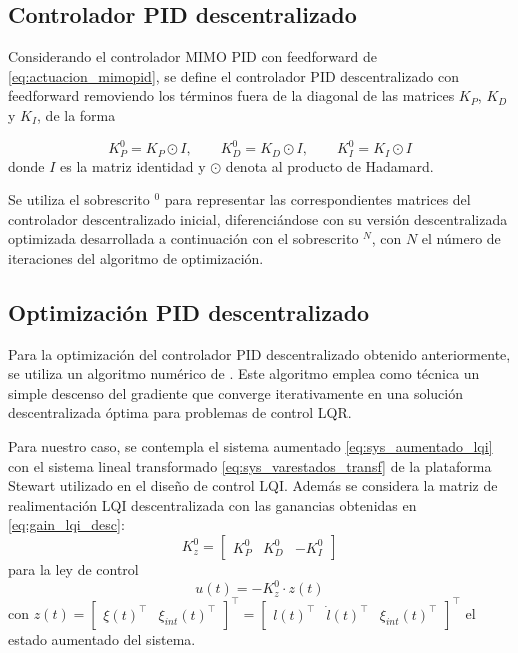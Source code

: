 \subsection{Controlador PID descentralizado}

Considerando el controlador MIMO PID con feedforward de \ref{eq:actuacion_mimopid}, se define el controlador PID descentralizado con feedforward removiendo los términos fuera de la diagonal de las matrices $K_P$, $K_D$ y $K_I$, de la forma

\begin{equation} \label{eq:gain_lqi_desc}
    K_P^0 = K_P \odot I, \qquad K_D^0 = K_D \odot I, \qquad K_I^0 = K_I \odot I 
\end{equation}
donde $I$ es la matriz identidad y $\odot$ denota al producto de Hadamard.

\begin{remark}
    Se utiliza el sobrescrito $^0$ para representar las correspondientes matrices del controlador descentralizado inicial, diferenciándose con su versión descentralizada optimizada desarrollada a continuación con el sobrescrito $^N$, con $N$ el número de iteraciones del algoritmo de optimización.
\end{remark}

\subsection{Optimización PID descentralizado}

Para la optimización del controlador PID descentralizado obtenido anteriormente, se utiliza un algoritmo numérico de \cite{silva2006lqr}. Este algoritmo emplea como técnica un simple descenso del gradiente que converge iterativamente en una solución descentralizada óptima para problemas de control LQR.

Para nuestro caso, se contempla el sistema aumentado \ref{eq:sys_aumentado_lqi} con el sistema lineal transformado \ref{eq:sys_varestados_transf} de la plataforma Stewart utilizado en el diseño de control LQI. Además se considera la matriz de realimentación LQI descentralizada con las ganancias obtenidas en \ref{eq:gain_lqi_desc}:
\begin{equation} \label{eq:gain_lqi_desc2}
    K_z^0 = \begin{bmatrix}
        K_P^0 & K_D^0 & -K_I^0
    \end{bmatrix}
\end{equation}
para la ley de control 
\begin{equation}
    u(t) = -K_z^0 \cdot z(t)
\end{equation}
con $z(t)=\begin{bmatrix} \xi(t)^{\top} & \xi_{int}(t)^{\top} \end{bmatrix}^{\top} = \begin{bmatrix} l(t)^{\top} & \dot{l}(t)^{\top} & \xi_{int}(t)^{\top} \end{bmatrix}^{\top}$ el estado aumentado del sistema.

